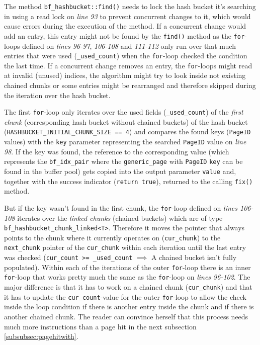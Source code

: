 	The method \lstinline{bf_hashbucket::find()} needs to lock the hash bucket it's searching in using a read lock on \emph{line 93} to prevent concurrent changes to it, which would cause errors during the execution of the method. If a concurrent change would add an entry, this entry might not be found by the \lstinline{find()} method as the \lstinline{for}-loops defined on \emph{lines 96-97}, \emph{106-108} and \emph{111-112} only run over that much entries that were used (\lstinline{_used_count}) when the \lstinline{for}-loop checked the condition the last time. If a concurrent change removes an entry, the \lstinline{for}-loops might read at invalid (unused) indices, the algorithm might try to look inside not existing chained chunks or some entries might be rearranged and therefore skipped during the iteration over the hash bucket.
	
	The first \lstinline{for}-loop only iterates over the used fields (\lstinline{_used_count}) of the \emph{first chunk} (corresponding hash bucket without chained buckets) of the hash bucket (\lstinline{HASHBUCKET_INITIAL_CHUNK_SIZE == 4}) and compares the found keys (\lstinline{PageID} values) with the \lstinline{key} parameter representing the searched \lstinline{PageID} value on \emph{line 98}. If the key was found, the reference to the corresponding value (which represents the \lstinline{bf_idx_pair} where the \lstinline{generic_page} with \lstinline{PageID} \lstinline{key} can be found in the buffer pool) gets copied into the output parameter \lstinline{value} and, together with the success indicator (\lstinline{return true}), returned to the calling \lstinline{fix()} method.
	
	But if the key wasn't found in the first chunk, the \lstinline{for}-loop defined on \emph{lines 106-108} iterates over the \emph{linked chunks} (chained buckets) which are of type \lstinline{bf_hashbucket_chunk_linked<T>}. Therefore it moves the pointer that always points to the chunk where it currently operates on (\lstinline{cur_chunk}) to the \lstinline{next_chunk} pointer of the \lstinline{cur_chunk} within each iteration until the last entry was checked (\lstinline{cur_count >= _used_count} $\implies$ A chained bucket isn't fully populated). Within each of the iterations of the outer \lstinline{for}-loop there is an inner \lstinline{for}-loop that works pretty much the same as the \lstinline{for}-loop on \emph{lines 96-102}. The major difference is that it has to work on a chained chunk (\lstinline{cur_chunk}) and that it has to update the \lstinline{cur_count}-value for the outer \lstinline{for}-loop to allow the check inside the loop condition if there is another entry inside the chunk and if there is another chained chunk. The reader can convince herself that this process needs much more instructions than a page hit in the next subsection \ref{subsubsec:pagehitwith}.
	
